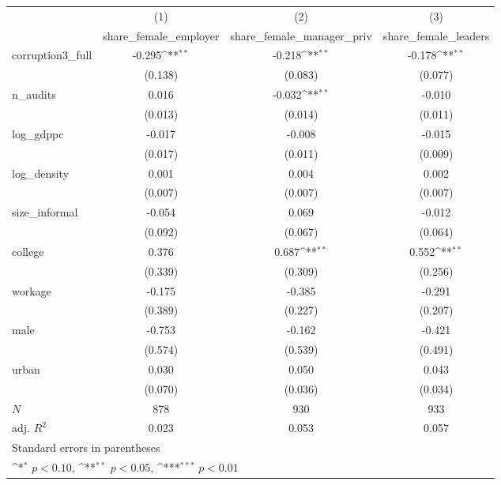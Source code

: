 {
\def\sym#1{\ifmmode^{#1}\else\(^{#1}\)\fi}
\begin{tabular}{l*{3}{c}}
\hline\hline
            &\multicolumn{1}{c}{(1)}&\multicolumn{1}{c}{(2)}&\multicolumn{1}{c}{(3)}\\
            &\multicolumn{1}{c}{share\_female\_employer}&\multicolumn{1}{c}{share\_female\_manager\_priv}&\multicolumn{1}{c}{share\_female\_leaders}\\
\hline
corruption3\_full&      -0.295\sym{**} &      -0.218\sym{**} &      -0.178\sym{**} \\
            &     (0.138)         &     (0.083)         &     (0.077)         \\
[1em]
n\_audits    &       0.016         &      -0.032\sym{**} &      -0.010         \\
            &     (0.013)         &     (0.014)         &     (0.011)         \\
[1em]
log\_gdppc   &      -0.017         &      -0.008         &      -0.015         \\
            &     (0.017)         &     (0.011)         &     (0.009)         \\
[1em]
log\_density &       0.001         &       0.004         &       0.002         \\
            &     (0.007)         &     (0.007)         &     (0.007)         \\
[1em]
size\_informal&      -0.054         &       0.069         &      -0.012         \\
            &     (0.092)         &     (0.067)         &     (0.064)         \\
[1em]
college     &       0.376         &       0.687\sym{**} &       0.552\sym{**} \\
            &     (0.339)         &     (0.309)         &     (0.256)         \\
[1em]
workage     &      -0.175         &      -0.385         &      -0.291         \\
            &     (0.389)         &     (0.227)         &     (0.207)         \\
[1em]
male        &      -0.753         &      -0.162         &      -0.421         \\
            &     (0.574)         &     (0.539)         &     (0.491)         \\
[1em]
urban       &       0.030         &       0.050         &       0.043         \\
            &     (0.070)         &     (0.036)         &     (0.034)         \\
\hline
\(N\)       &         878         &         930         &         933         \\
adj. \(R^{2}\)&       0.023         &       0.053         &       0.057         \\
\hline\hline
\multicolumn{4}{l}{\footnotesize Standard errors in parentheses}\\
\multicolumn{4}{l}{\footnotesize \sym{*} \(p<0.10\), \sym{**} \(p<0.05\), \sym{***} \(p<0.01\)}\\
\end{tabular}
}
